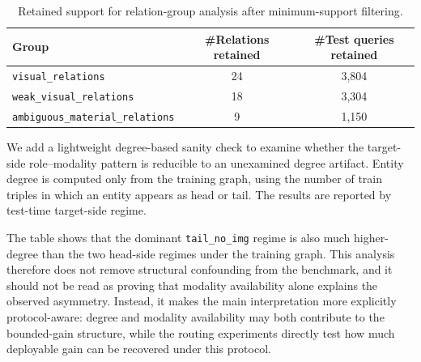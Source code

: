 \documentclass[11pt]{article}
\begin{document}
\begin{table}[H]
\centering
\caption{Retained support for relation-group analysis after minimum-support filtering.}
\label{tab:relation_group_support}
\small
\begin{tabular}{lcc}
\toprule
Group & \#Relations retained & \#Test queries retained \\
\midrule
\texttt{visual\_relations} & 24 & 3{,}804 \\
\texttt{weak\_visual\_relations} & 18 & 3{,}304 \\
\texttt{ambiguous\_material\_relations} & 9 & 1{,}150 \\
\bottomrule
\end{tabular}
\end{table}

We add a lightweight degree-based sanity check to examine whether the target-side role--modality pattern is reducible to an unexamined degree artifact. Entity degree is computed only from the training graph, using the number of train triples in which an entity appears as head or tail. The results are reported by test-time target-side regime.



The table shows that the dominant \texttt{tail\_no\_img} regime is also much higher-degree than the two head-side regimes under the training graph. This analysis therefore does not remove structural confounding from the benchmark, and it should not be read as proving that modality availability alone explains the observed asymmetry. Instead, it makes the main interpretation more explicitly protocol-aware: degree and modality availability may both contribute to the bounded-gain structure, while the routing experiments directly test how much deployable gain can be recovered under this protocol.
\end{document}
